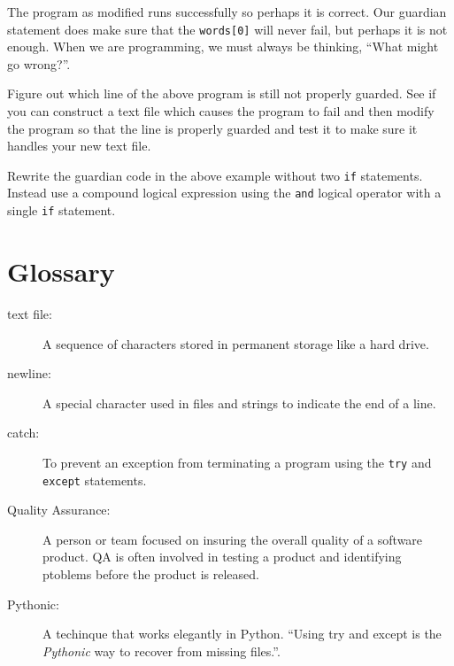 \documentclass[10pt]{book}
\begin{document}
The program as modified runs successfully so perhaps it is correct.  Our
guardian statement does make sure that the {\tt words[0]} will never fail, 
but perhaps it is not enough.  When we are programming, we must always be 
thinking, ``What might go wrong?''.

\begin{ex}
Figure out which line of the above program is still not properly guarded.
See if you can construct a text file which causes the program to fail
and then modify the program so that the line is properly guarded and 
test it to make sure it handles your new text file.
\end{ex}

\begin{ex}
Rewrite the guardian code in the above example without two
{\tt if} statements.  Instead use a compound logical expression using the
{\tt and} logical operator with a single {\tt if} statement.
\end{ex}


\section{Glossary}

\begin{description}

\item[text file:] A sequence of characters stored in permanent
storage like a hard drive.

\item[newline:] A special character used in files and strings to indicate
the end of a line.

\item[catch:] To prevent an exception from terminating
a program using the {\tt try}
and {\tt except} statements.

\item[Quality Assurance:] A person or team focused on insuring the 
overall quality of a software product.  QA is often involved 
in testing a product and identifying ptoblems before the product 
is released.

\item[Pythonic:] A techinque that works elegantly in Python.
``Using try and except is the {\em Pythonic} way to recover from 
missing files.''.

\end{description}
\end{document}

